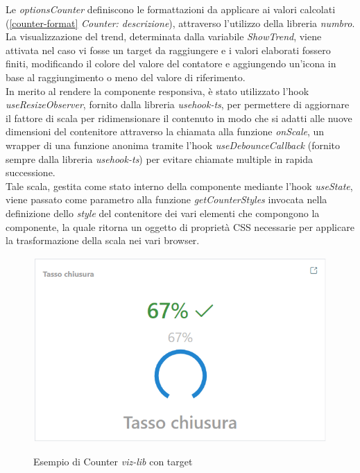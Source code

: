 Le \textit{optionsCounter} definiscono le formattazioni da applicare ai valori calcolati (\ref{counter-format} \textit{Counter: descrizione}), attraverso l'utilizzo della libreria \textit{numbro}. \\
La visualizzazione del trend, determinata dalla variabile \textit{ShowTrend}, viene attivata nel caso vi fosse un target da raggiungere e i valori elaborati
fossero finiti, modificando il colore del valore del contatore e aggiungendo un'icona in base al raggiungimento o meno del valore di riferimento. \\
In merito al rendere la componente responsiva, è stato utilizzato l'hook \textit{useResizeObserver}, fornito dalla libreria \textit{usehook-ts}, per permettere di
aggiornare il fattore di scala per ridimensionare il contenuto in modo che si adatti alle nuove dimensioni del contenitore attraverso la chiamata alla funzione \textit{onScale},
un wrapper di una funzione anonima tramite l'hook \textit{useDebounceCallback} (fornito sempre dalla libreria \textit{usehook-ts}) per evitare chiamate multiple in rapida successione. \\
Tale scala, gestita come stato interno della componente mediante l'hook \textit{useState}, viene passato come parametro alla funzione \textit{getCounterStyles} invocata nella definizione
dello \textit{style} del contenitore dei vari elementi che compongono la componente, la quale ritorna un oggetto di proprietà CSS necessarie per applicare la trasformazione della scala nei
vari browser.

\begin{figure}[H]
    \centering
    \includegraphics[alt={Esempio di Counter viz-lib con target}, width=0.5 \columnwidth, height=\maxdimen, keepaspectratio]{img/ex_counter.png}
    \caption{Esempio di Counter \textit{viz-lib} con target}
    \label{fig:counter-example}
\end{figure}

